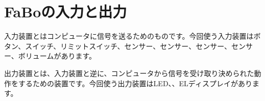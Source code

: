 \section{FaBoの入力と出力}
入力装置とはコンピュータに信号を送るためのものです。今回使う入力装置はボタン、スイッチ、リミットスイッチ、センサー、センサー、センサー、センサー、ボリュームがあります。

出力装置とは、入力装置と逆に、コンピュータから信号を受け取り決められた動作をするための装置です。今回使う出力装置はLED、、ELディスプレイがあります。\\
\begin{tcolorbox}[title=\useOmetoi]
\begin{enumerate}
\end{enumerate}
\end{tcolorbox}













